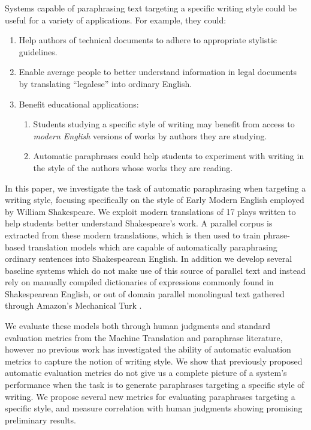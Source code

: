 \documentclass[10pt,a5paper,twoside]{article}
\begin{document}
Systems capable of paraphrasing text targeting a specific writing style could be useful for a variety of applications.  For example, they could:
\begin{enumerate}
  \item Help authors of technical documents to adhere to appropriate stylistic guidelines.  
  \item Enable average people to better understand information in legal documents by translating ``legalese'' into ordinary English.  
  \item Benefit educational applications:
    \begin{enumerate}
    \item Students studying a specific style of writing may benefit from access to \emph{modern English} versions of works by authors they are studying.
    \item Automatic paraphrases could help students to experiment with writing in the style of the authors whose works they are reading.
    \end{enumerate}
\end{enumerate}

In this paper, we investigate the task of automatic paraphrasing when targeting a writing style, focusing specifically on the style of Early Modern English employed by William Shakespeare.
We exploit modern translations of 17 plays written to help students better understand Shakespeare's work.  A parallel corpus is extracted from these modern translations,
which is then used to train phrase-based translation models which are capable of automatically paraphrasing ordinary sentences into Shakespearean English.  In addition we develop several
baseline systems which do not make use of this source of parallel text and instead rely on manually compiled dictionaries of expressions commonly found in Shakespearean English, or out of
domain parallel monolingual text gathered through Amazon's Mechanical Turk \cite{chen11}.

We evaluate these models both through human judgments and standard evaluation metrics from the Machine Translation and paraphrase literature, however no previous work has investigated the ability of automatic
evaluation metrics to capture the notion of writing style.  
We show that previously proposed automatic evaluation metrics do not give us a complete picture of a system's performance when the task is to generate paraphrases
targeting a specific style of writing.  We propose several new metrics for evaluating paraphrases targeting a specific style, and measure correlation with human judgments showing promising
preliminary results.
\end{document}

